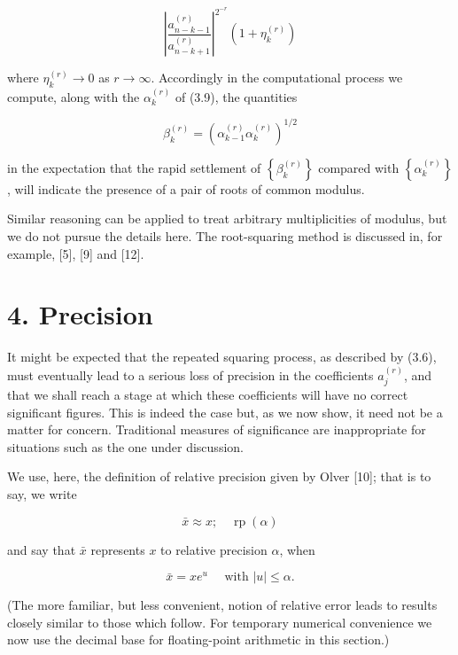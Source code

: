 \documentclass[10pt]{article}
\begin{document}
\begin{equation*}
\left|\frac{a_{n-k-1}^{(r)}}{a_{n-k+1}^{(r)}}\right|^{2^{-r}}\left(1+\eta_{k}^{(r)}\right) \tag{3.10}
\end{equation*}


where $\eta_{k}^{(r)} \rightarrow 0$ as $r \rightarrow \infty$. Accordingly in the computational process we compute, along with the $\alpha_{k}^{(r)}$ of (3.9), the quantities


\begin{equation*}
\beta_{k}^{(r)}=\left(\alpha_{k-1}^{(r)} \alpha_{k}^{(r)}\right)^{1 / 2} \tag{3.11}
\end{equation*}


in the expectation that the rapid settlement of $\left\{\beta_{k}^{(r)}\right\}$ compared with $\left\{\alpha_{k}^{(r)}\right\}$, will indicate the presence of a pair of roots of common modulus.

Similar reasoning can be applied to treat arbitrary multiplicities of modulus, but we do not pursue the details here. The root-squaring method is discussed in, for example, [5], [9] and [12].

\section*{4. Precision}
It might be expected that the repeated squaring process, as described by (3.6), must eventually lead to a serious loss of precision in the coefficients $a_{j}^{(r)}$, and that we shall reach a stage at which these coefficients will have no correct significant figures. This is indeed the case but, as we now show, it need not be a matter for concern. Traditional measures of significance are inappropriate for situations such as the one under discussion.

We use, here, the definition of relative precision given by Olver [10]; that is to say, we write


\begin{equation*}
\bar{x} \approx x ; \quad \operatorname{rp}(\alpha) \tag{4.1}
\end{equation*}


and say that $\bar{x}$ represents $x$ to relative precision $\alpha$, when


\begin{equation*}
\bar{x}=x e^{u} \quad \text { with }|u| \leq \alpha . \tag{4.2}
\end{equation*}


(The more familiar, but less convenient, notion of relative error leads to results closely similar to those which follow. For temporary numerical convenience we now use the decimal base for floating-point arithmetic in this section.)
\end{document}
